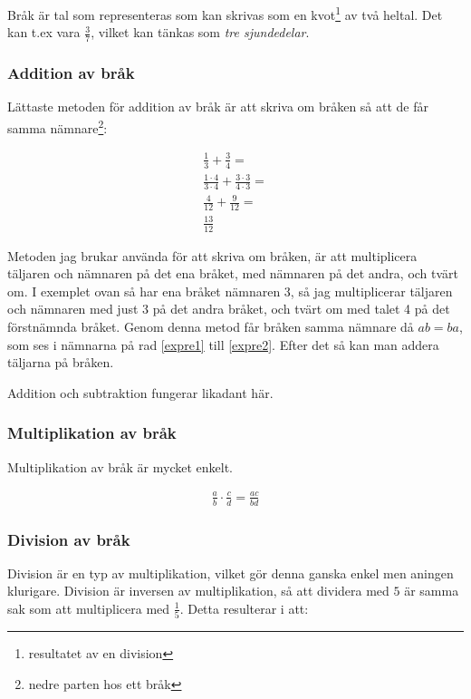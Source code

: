 Bråk är tal som representeras som kan skrivas som en kvot\footnote{resultatet av en division} av två heltal. Det kan t.ex vara $\frac{3}{7}$, vilket kan tänkas som  \textit{tre sjundedelar}.

\subsubsection{Addition av bråk}
\label{Addition av bråk}
Lättaste metoden för addition av bråk är att skriva om bråken så att de får samma nämnare\footnote{nedre parten hos ett bråk}:

\begin{align}
	\frac{1}{3} + \frac{3}{4} = \\
	\frac{1\cdot 4}{3\cdot 4} + \frac{3\cdot 3}{4\cdot 3} = \label{expre1} \\
	\frac{4}{12} + \frac{9}{12} = \label{expre2} \\
	\frac{13}{12}
\end{align}

Metoden jag brukar använda för att skriva om bråken, är att multiplicera täljaren och nämnaren på det ena bråket, med nämnaren på det andra, och tvärt om. I exemplet ovan så har ena bråket nämnaren 3, så jag multiplicerar täljaren och nämnaren med just 3 på det andra bråket, och tvärt om med talet 4 på det förstnämnda bråket. Genom denna metod får bråken samma nämnare då $ab = ba$, som ses i nämnarna på rad \eqref{expre1} till \eqref{expre2}. Efter det så kan man addera täljarna på bråken.

Addition och subtraktion fungerar likadant här.

\subsubsection{Multiplikation av bråk}

Multiplikation av bråk är mycket enkelt.

\begin{align}
	\frac{a}{b} \cdot \frac{c}{d} = \frac{ac}{bd}
\end{align}

\subsubsection{Division av bråk}
\label{Division av bråk}

Division är en typ av multiplikation, vilket gör denna ganska enkel men aningen klurigare. Division är inversen av multiplikation, så att dividera med $5$ är samma sak som att multiplicera med $\frac{1}{5}$. Detta resulterar i att:

